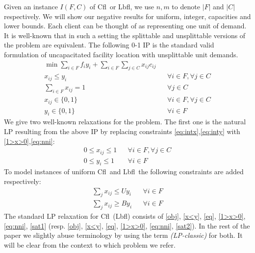 \documentclass[11pt]{article}\usepackage{amsmath}
\newcommand{\lbfl}{{\sc Lbfl}}
\newcommand{\cfl}{{\sc Cfl}}
\begin{document}
Given an instance $I(F,C)$ of \cfl\ or \lbfl, we use $n, m$ to denote $|F|$ and $|C|$
respectively.
We will show our negative results for uniform, integer, capacities and lower
bounds. Each client can be thought of as representing one unit of demand.
 It  is  well-known  that in such a setting  the  splittable  and
unsplittable versions  of the problem are equivalent. 
The following 0-1  IP is the standard  valid formulation of uncapacitated 
facility location with unsplittable unit demands.
\begin{align}
\min \sum_{i \in F} f_iy_i + \sum_{i \in F}\sum_{j
  \in C} x_{ij}c_{ij}   & &    \label{obj} \\   
x_{ij} \leq y_i   &&  \forall i \in F, \forall j \in C   \label{x<y} \\
\sum_{i \in F} x_{ij} =1   &&   \forall j \in C   \label{eqq}  \\
x_{ij} \in \{0,1\} &&  \forall i \in F, \forall j \in C  \label{eq:intx} \\
y_i \in \{0,1\}   && \forall i \in F   \label{eq:inty}
\end{align}
We give two well-known relaxations  for the problem.  The first one is the
natural  LP resulting from the above IP by replacing constraints
\eqref{eq:intx},\eqref{eq:inty} with \eqref{1>x>0},\eqref{eq:nni}: 
\begin{align}
0 \leq x_{ij} \leq 1 &&  \forall i \in F, \forall j \in C  \label{1>x>0}  \\
0 \leq y_i \leq 1  && \forall i \in F    \label{eq:nni}
\end{align} 
To model instances of uniform \cfl\ and \lbfl\ the following constraints are added
respectively:
\begin{align}
\sum_ {j} x_{ij} \leq U y_i    && \forall i \in F   \label{sat1}\\
\sum_ {j} x_{ij} \geq By_i    && \forall i \in F   \label{sat2}
\end{align} 
The standard LP relaxation for \cfl\ (\lbfl) consists of \eqref{obj},  \eqref{x<y}, \eqref{eq},
 \eqref{1>x>0}, \eqref{eq:nni}, \eqref{sat1}  (resp. \eqref{obj}, \eqref{x<y}, \eqref{eq},
 \eqref{1>x>0}, \eqref{eq:nni}, \eqref{sat2}). 
In the rest of the paper we slightly abuse terminology by 
using  the term {\em (LP-classic)} for both. It will be clear from the context to
which problem we refer. 
\end{document}

